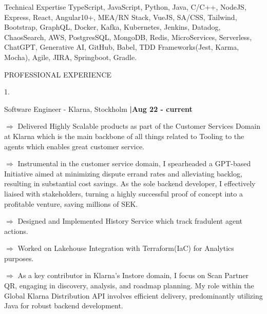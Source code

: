 \documentclass{resume} %
\begin{document}

\begin{rSection}{Technical Expertise}
TypeScript, JavaScript, Python, Java, C/C++, NodeJS, Express, React, 
Angular10+, MEA/RN Stack, VueJS, SA/CSS, Tailwind, Bootstrap, GraphQL,
Docker, Kafka, Kubernetes, Jenkins, Datadog, ChaosSearch, AWS, PostgresSQL, MongoDB, Redis, MicroServices, Serverless, ChatGPT, Generative AI,
GitHub, Babel, TDD Frameworks(Jest, Karma, Mocha), Agile, JIRA, Springboot, Gradle.
\end{rSection}
\begin{rSection}{PROFESSIONAL EXPERIENCE}
\setlength{\itemindent}{-.1in}

\item[1.]\begin{rSubsection}{Software Engineer - Klarna, Stockholm }{\bf |Aug 22 - current}
{{\bf}}{}
\item[$\Rightarrow$] Delivered Highly Scalable products as part of the Customer Services Domain at Klarna which is the main backbone of all things related to Tooling to the agents which enables great customer service.
\item[$\Rightarrow$] Instrumental in the customer service domain, I spearheaded a GPT-based Initiative aimed at minimizing dispute errand rates and alleviating backlog, resulting in substantial cost savings. As the sole backend developer, I effectively liaised with stakeholders, turning a highly successful proof of concept into a profitable venture, saving millions of SEK.
\item[$\Rightarrow$] Designed and Implemented History Service which track fradulent agent actions.
\item[$\Rightarrow$] Worked on Lakehouse Integration with Terraform(IaC) for Analytics purposes.
\item[$\Rightarrow$] As a key contributor in Klarna's Instore domain, I focus on Scan Partner QR, engaging in discovery, analysis, and roadmap planning. My role within the Global Klarna Distribution API involves efficient delivery, predominantly utilizing Java for robust backend development.
\end{rSubsection}
\vspace{1em}


\end{rSection}
\end{document}
